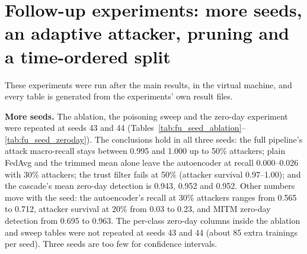 \section{Follow-up experiments: more seeds, an adaptive attacker, pruning and a time-ordered split}\label{sec:followups}
These experiments were run after the main results, in the virtual machine, and every table is generated from the experiments' own result files.

\textbf{More seeds.} The ablation, the poisoning sweep and the zero-day experiment were repeated at seeds 43 and 44 (Tables~\ref{tab:fu_seed_ablation}--\ref{tab:fu_seed_zeroday}). The conclusions hold in all three seeds: the full pipeline's attack macro-recall stays between 0.995 and 1.000 up to 50\% attackers; plain FedAvg and the trimmed mean alone leave the autoencoder at recall 0.000--0.026 with 30\% attackers; the trust filter fails at 50\% (attacker survival 0.97--1.00); and the cascade's mean zero-day detection is 0.943, 0.952 and 0.952. Other numbers move with the seed: the autoencoder's recall at 30\% attackers ranges from 0.565 to 0.712, attacker survival at 20\% from 0.03 to 0.23, and MITM zero-day detection from 0.695 to 0.963. The per-class zero-day columns inside the ablation and sweep tables were not repeated at seeds 43 and 44 (about 85 extra trainings per seed). Three seeds are too few for confidence intervals.

